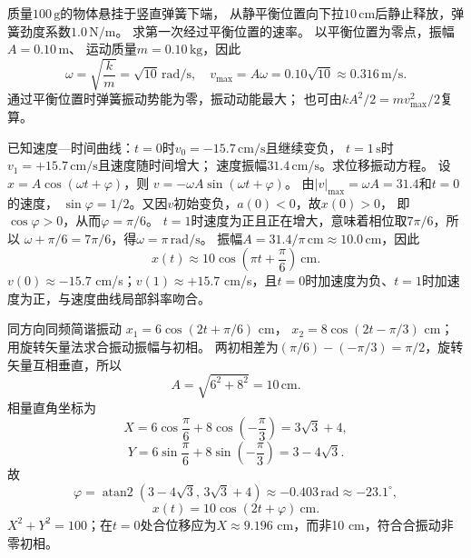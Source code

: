 \problemtext 质量$100\,\mathrm g$的物体悬挂于竖直弹簧下端，
从静平衡位置向下拉$10\,\mathrm{cm}$后静止释放，弹簧劲度系数$1.0\,\mathrm{N/m}$。
求第一次经过平衡位置的速率。
\workings
以平衡位置为零点，振幅$A=0.10\,\mathrm m$、
运动质量$m=0.10\,\mathrm{kg}$，因此
\[
\omega=\sqrt{\frac{k}{m}}=\sqrt{10}\,\mathrm{rad/s},\quad
\boxed{v_{\max}=A\omega=0.10\sqrt{10}\approx0.316\,\mathrm{m/s}}.
\]
\crosscheck 通过平衡位置时弹簧振动势能为零，振动动能最大；
也可由$kA^2/2=mv_{\max}^2/2$复算。

\problemtext 已知速度—时间曲线：$t=0$时$v_0=-15.7\,\mathrm{cm/s}$且继续变负，
$t=1\,\mathrm s$时$v_1=+15.7\,\mathrm{cm/s}$且速度随时间增大；
速度振幅$31.4\,\mathrm{cm/s}$。求位移振动方程。
\workings
设$x=A\cos(\omega t+\varphi)$，则
$v=-\omega A\sin(\omega t+\varphi)$。
由$|v|_{\max}=\omega A=31.4$和$t=0$的速度，
$\sin\varphi=1/2$。又因$v$初始变负，$a(0)<0$，故$x(0)>0$，
即$\cos\varphi>0$，从而$\varphi=\pi/6$。
$t=1$时速度为正且正在增大，意味着相位取$7\pi/6$，所以
$\omega+\pi/6=7\pi/6$，得$\omega=\pi\,\mathrm{rad/s}$。
振幅$A=31.4/\pi\,\mathrm{cm}\approx10.0\,\mathrm{cm}$，因此
\[
\boxed{x(t)\approx10\cos\left(\pi t+\frac{\pi}{6}\right)\ \mathrm{cm}}.
\]
\crosscheck $v(0)\approx-15.7$ cm/s；$v(1)\approx+15.7$ cm/s，且$t=0$时加速度为负、$t=1$时加速度为正，与速度曲线局部斜率吻合。

\problemtext 同方向同频简谐振动
$x_1=6\cos(2t+\pi/6)$ cm，
$x_2=8\cos(2t-\pi/3)$ cm；
用旋转矢量法求合振动振幅与初相。
\workings
两初相差为$(\pi/6)-(-\pi/3)=\pi/2$，旋转矢量互相垂直，所以
\[
\boxed{A=\sqrt{6^2+8^2}=10\,\mathrm{cm}}.
\]
相量直角坐标为
\[
X=6\cos\frac{\pi}{6}+8\cos\left(-\frac{\pi}{3}\right)
=3\sqrt3+4,
\]
\[
Y=6\sin\frac{\pi}{6}+8\sin\left(-\frac{\pi}{3}\right)
=3-4\sqrt3.
\]
故
\[
\boxed{\varphi=\operatorname{atan2}(3-4\sqrt3,\,3\sqrt3+4)
\approx-0.403\,\mathrm{rad}\approx-23.1^\circ},
\]
\[
\boxed{x(t)=10\cos(2t+\varphi)\ \mathrm{cm}}.
\]
\crosscheck $X^2+Y^2=100$；在$t=0$处合位移应为$X\approx9.196$ cm，而非10 cm，符合合振动非零初相。
